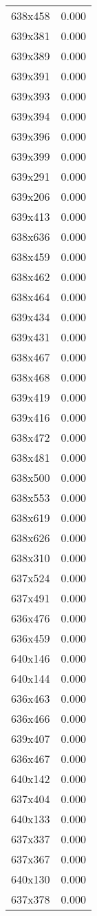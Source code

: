 \begin{table}
\begin{tabular}{lr}
638x458 & 0.000 \\
639x381 & 0.000 \\
639x389 & 0.000 \\
639x391 & 0.000 \\
639x393 & 0.000 \\
639x394 & 0.000 \\
639x396 & 0.000 \\
639x399 & 0.000 \\
639x291 & 0.000 \\
639x206 & 0.000 \\
639x413 & 0.000 \\
638x636 & 0.000 \\
638x459 & 0.000 \\
638x462 & 0.000 \\
638x464 & 0.000 \\
639x434 & 0.000 \\
639x431 & 0.000 \\
638x467 & 0.000 \\
638x468 & 0.000 \\
639x419 & 0.000 \\
639x416 & 0.000 \\
638x472 & 0.000 \\
638x481 & 0.000 \\
638x500 & 0.000 \\
638x553 & 0.000 \\
638x619 & 0.000 \\
638x626 & 0.000 \\
638x310 & 0.000 \\
637x524 & 0.000 \\
637x491 & 0.000 \\
636x476 & 0.000 \\
636x459 & 0.000 \\
640x146 & 0.000 \\
640x144 & 0.000 \\
636x463 & 0.000 \\
636x466 & 0.000 \\
639x407 & 0.000 \\
636x467 & 0.000 \\
640x142 & 0.000 \\
637x404 & 0.000 \\
640x133 & 0.000 \\
637x337 & 0.000 \\
637x367 & 0.000 \\
640x130 & 0.000 \\
637x378 & 0.000 \\

\end{tabular}
\end{table}

